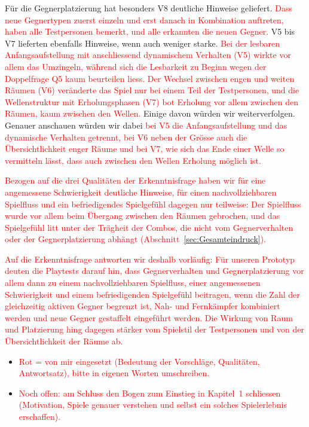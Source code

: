 \documentclass[../Main.tex]{subfiles}
\begin{document}
Für die Gegnerplatzierung hat besonders V8 deutliche Hinweise geliefert. \textcolor{red}{Dass neue Gegnertypen zuerst einzeln und erst danach in Kombination auftreten, haben alle Testpersonen bemerkt, und alle erkannten die neuen Gegner.} V5 bis V7 lieferten ebenfalls Hinweise, wenn auch weniger starke. \textcolor{red}{Bei der lesbaren Anfangsaufstellung mit anschliessend dynamischem Verhalten (V5) wirkte vor allem das Umzingeln, während sich die Lesbarkeit zu Beginn wegen der Doppelfrage Q5 kaum beurteilen liess. Der Wechsel zwischen engen und weiten Räumen (V6) veränderte das Spiel nur bei einem Teil der Testpersonen, und die Wellenstruktur mit Erholungsphasen (V7) bot Erholung vor allem zwischen den Räumen, kaum zwischen den Wellen.} Einige davon würden wir weiterverfolgen. Genauer anschauen würden wir dabei \textcolor{red}{bei V5 die Anfangsaufstellung und das dynamische Verhalten getrennt, bei V6 neben der Grösse auch die Übersichtlichkeit enger Räume und bei V7, wie sich das Ende einer Welle so vermitteln lässt, dass auch zwischen den Wellen Erholung möglich ist.}

\textcolor{red}{Bezogen auf die drei Qualitäten der Erkenntnisfrage haben wir für eine angemessene Schwierigkeit deutliche Hinweise, für einen nachvollziehbaren Spielfluss und ein befriedigendes Spielgefühl dagegen nur teilweise: Der Spielfluss wurde vor allem beim Übergang zwischen den Räumen gebrochen, und das Spielgefühl litt unter der Trägheit der Combos, die nicht vom Gegnerverhalten oder der Gegnerplatzierung abhängt (Abschnitt~\ref{sec:Gesamteindruck}).}

\textcolor{red}{Auf die Erkenntnisfrage antworten wir deshalb vorläufig: Für unseren Prototyp deuten die Playtests darauf hin, dass Gegnerverhalten und Gegnerplatzierung vor allem dann zu einem nachvollziehbaren Spielfluss, einer angemessenen Schwierigkeit und einem befriedigenden Spielgefühl beitragen, wenn die Zahl der gleichzeitig aktiven Gegner begrenzt ist, Nah- und Fernkämpfer kombiniert werden und neue Gegner gestaffelt eingeführt werden. Die Wirkung von Raum und Platzierung hing dagegen stärker vom Spielstil der Testpersonen und von der Übersichtlichkeit der Räume ab.}

\begin{itemize}[leftmargin=1.5cm]
    \item \textcolor{red}{Rot = von mir eingesetzt (Bedeutung der Vorschläge, Qualitäten, Antwortsatz), bitte in eigenen Worten umschreiben.}
    \item \textcolor{red}{Noch offen: am Schluss den Bogen zum Einstieg in Kapitel~1 schliessen (Motivation, Spiele genauer verstehen und selbst ein solches Spielerlebnis erschaffen).}
\end{itemize}
\end{document}

